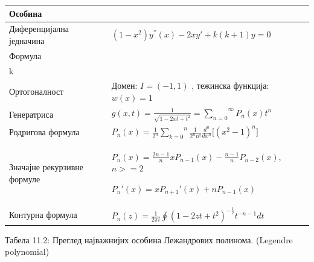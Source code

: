{\def\LTcaptype{none} %
\begin{longtable}[]{@{}
  >{\raggedright\arraybackslash}p{}
  >{\centering\arraybackslash}p{}@{}}
\toprule\noalign{}
\begin{minipage}[b]{\linewidth}\raggedright
Особина
\end{minipage} & \begin{minipage}[b]{\linewidth}\centering
\end{minipage} \\
\midrule\noalign{}
\endhead
\bottomrule\noalign{}
\endlastfoot
Диференцијална једначина &
\((1 - x^{2})y^{''}(x) - 2xy' + k(k + 1)y = 0\) \\
Формула &
\(P_{n}(x) = \frac{1}{2^{n}}\overset{n}{\sum_{k = 0}}\left( \begin{array}{r}
n \\
k
\end{array} \right)^{2}{(x - 1)}^{n - k}{(x + 1)}^{k}\) \\
Ортогоналност & Домен: \(I = ( - 1,1)\) , тежинска функција:
\(w(x) = 1\) \\
Генератриса &
\(g(x,t) = \frac{1}{\sqrt{1 - 2xt + t^{2}}} = \overset{\infty}{\sum_{n = 0}}P_{n}(x)t^{n}\) \\
Родригова формула &
\(P_{n}(x) = \frac{1}{2^{n}}\overset{n}{\sum_{k = 0}}\frac{1}{2^{n}n!}\frac{d^{n}}{dx^{n}}\lbrack{(x^{2} - 1)}^{n}\rbrack\) \\
Значајне рекурзивне формуле &
\(P_{n}(x) = \frac{2n - 1}{n}xP_{n - 1}(x) - \frac{n - 1}{n}P_{n - 2}(x)\),
\(n > = 2\)

\(P_{n}'(x) = xP_{n + 1}'(x) + nP_{n - 1}(x)\) \\
Контурна формула &
\(P_{n}(z) = \frac{1}{2\pi i}\oint{(1 - 2zt + t^{2})}^{- \frac{1}{2}}t^{- n - 1}dt\) \\
\end{longtable}
}

Табела 11.2: Преглед најважнијих особина Лежандрових полинома. (Legendre
polynomial)

